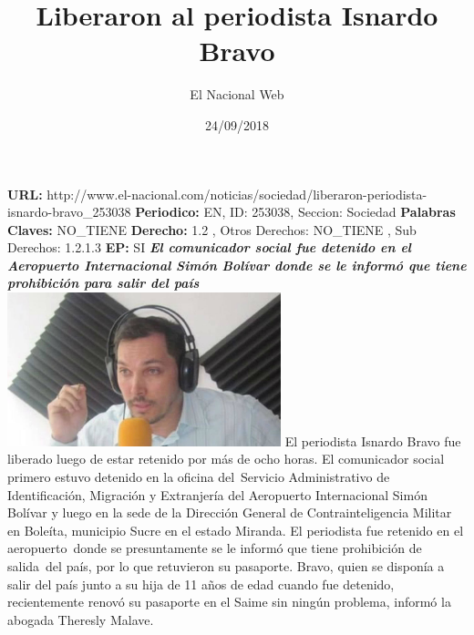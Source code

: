 \documentclass{article}%
\title{\textbf{Liberaron al periodista Isnardo Bravo}}%
\author{El Nacional Web}%
\date{24/09/2018}%
\begin{document}
%
\normalsize%
\maketitle%
\textbf{URL: }%
http://www.el{-}nacional.com/noticias/sociedad/liberaron{-}periodista{-}isnardo{-}bravo\_253038\newline%
%
\textbf{Periodico: }%
EN, %
ID: %
253038, %
Seccion: %
Sociedad\newline%
%
\textbf{Palabras Claves: }%
NO\_TIENE\newline%
%
\textbf{Derecho: }%
1.2%
, Otros Derechos: %
NO\_TIENE%
, Sub Derechos: %
1.2.1.3%
\newline%
%
\textbf{EP: }%
SI\newline%
\newline%
%
\textbf{\textit{El comunicador social fue detenido en el Aeropuerto Internacional Simón Bolívar donde se le informó que tiene prohibición para salir del país ~}}%
\newline%
\newline%
%
\includegraphics[width=300px]{163.jpg}%
\newline%
%
El periodista Isnardo Bravo fue liberado luego de estar retenido por más de ocho horas.%
\newline%
%
El comunicador social primero estuvo detenido en la oficina del~Servicio Administrativo de Identificación, Migración y Extranjería del Aeropuerto Internacional Simón Bolívar y luego en la sede de la Dirección General de Contrainteligencia Militar en Boleíta, municipio Sucre en el estado Miranda.%
\newline%
%
El periodista fue retenido en el aeropuerto~donde se presuntamente se le informó que tiene prohibición de salida~del país, por lo que retuvieron su pasaporte.%
\newline%
%
Bravo, quien se disponía a salir del país junto a su hija de 11 años de edad cuando fue detenido, recientemente renovó su pasaporte en el Saime sin ningún problema, informó la abogada Theresly Malave.%
\newline%
%
\end{document}
